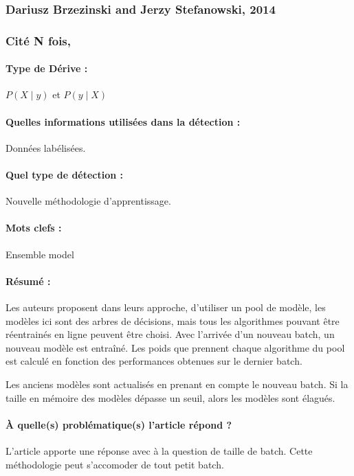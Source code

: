 \documentclass[11pt,a4paper]{report}
\begin{document}
\subsubsection{Dariusz Brzezinski and Jerzy Stefanowski, 2014}

\subsubsection{Cité N fois, }

\paragraph{Type de Dérive :} $P(X\mid y)$ et $P(y \mid X)$
\paragraph{Quelles informations utilisées dans la détection :} Données labélisées.
\paragraph{Quel type de détection :} Nouvelle méthodologie d'apprentissage.


\paragraph{Mots clefs :} Ensemble model

\paragraph{Résumé :} Les auteurs proposent dans leurs approche, d'utiliser un pool de modèle, les modèles ici sont des arbres de décisions, mais tous les algorithmes pouvant être réentrainés en ligne peuvent être choisi. Avec l'arrivée d'un nouveau batch, un nouveau modèle est entraîné. Les poids que prennent chaque algorithme du pool est calculé en fonction des performances obtenues sur le dernier batch. 

Les anciens modèles sont actualisés en prenant en compte le nouveau batch. Si la taille en mémoire des modèles dépasse un seuil, alors les modèles sont élagués.

\paragraph{À quelle(s) problématique(s) l'article répond ?} L'article apporte une réponse avec à la question de taille de batch. Cette méthodologie peut s'accomoder de tout petit batch.
\end{document}
